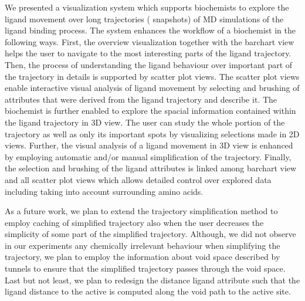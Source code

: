 We presented a visualization system which supports biochemists to explore the ligand movement over long trajectories ( snapshots) of MD simulations of the ligand binding process.
The system enhances the workflow of a biochemist in the following ways.
First, the overview visualization together with the barchart view helps the user to navigate to the most interesting parts of
the ligand trajectory.
Then, the process of understanding the ligand behaviour over important part of the trajectory in details is supported by scatter plot views.
The scatter plot views enable interactive visual analysis of ligand movement by selecting and brushing of attributes that were derived from the ligand trajectory and describe it.
The biochemist is further enabled to explore the spacial information contained within the ligand trajectory in 3D view.
The user can study the whole portion of the trajectory as well as only its important spots by visualizing selections made in 2D views.
Further, the visual analysis of a ligand movement in 3D view is enhanced by employing automatic and/or manual simplification of the trajectory.
Finally, the selection and brushing of the ligand attributes is linked among barchart view and all scatter plot views which allows detailed control over explored data including taking into account surrounding amino acids.

As a future work, we plan to extend the trajectory simplification method to employ caching of simplified trajectory also when the user decreases the simplicity of some part of the simplified trajectory.
Although, we did not observe in our experiments any chemically irrelevant behaviour when simplifying the trajectory, we plan to employ the information about void space described by tunnels to ensure that the simplified trajectory passes through the void space.
Last but not least, we plan to redesign the distance ligand attribute such that the ligand distance to the active is computed along the void path to the active site.